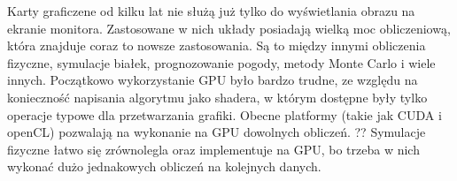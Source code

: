 

Karty graficzene od kilku lat nie służą już tylko do wyświetlania obrazu na ekranie monitora. Zastosowane w nich układy posiadają wielką moc obliczeniową, która znajduje coraz to nowsze zastosowania. Są to między innymi obliczenia fizyczne, symulacje białek, prognozowanie pogody, metody Monte Carlo i wiele innych. Początkowo wykorzystanie GPU było bardzo trudne, ze względu na konieczność napisania algorytmu jako shadera, w którym dostępne były tylko operacje typowe dla przetwarzania grafiki. Obecne platformy (takie jak CUDA i openCL) pozwalają na wykonanie na GPU dowolnych obliczeń. 
\linebreak
?? Symulacje fizyczne łatwo się zrównolegla oraz implementuje na GPU, bo trzeba w nich wykonać dużo jednakowych obliczeń na kolejnych danych. 
